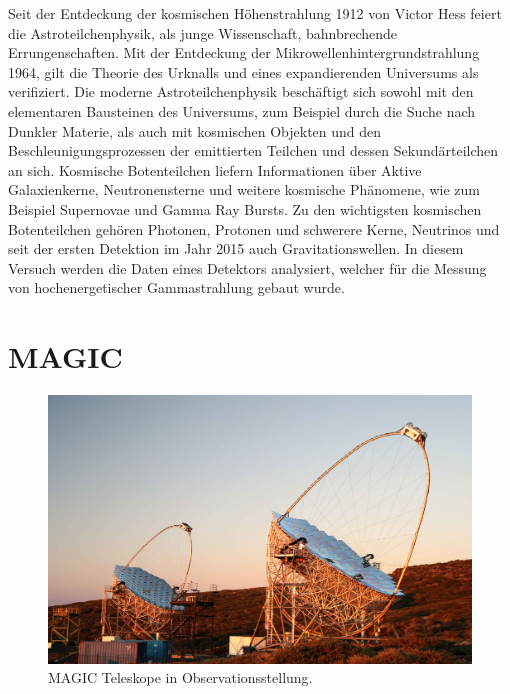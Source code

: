 Seit der Entdeckung der kosmischen Höhenstrahlung 1912
von Victor Hess feiert die Astroteilchenphysik,
als junge Wissenschaft,
bahnbrechende Errungenschaften.
Mit der Entdeckung der Mikrowellenhintergrundstrahlung 1964,
gilt die Theorie des Urknalls
und eines expandierenden Universums als verifiziert.
Die moderne Astroteilchenphysik beschäftigt sich sowohl mit den
elementaren Bausteinen des Universums,
zum Beispiel durch die Suche nach Dunkler Materie,
als auch mit kosmischen Objekten
und den Beschleunigungsprozessen der emittierten Teilchen
und dessen Sekundärteilchen an sich.
Kosmische Botenteilchen liefern Informationen über
Aktive Galaxienkerne,
Neutronensterne
und weitere kosmische Phänomene,
wie zum Beispiel Supernovae und Gamma Ray Bursts.
Zu den wichtigsten kosmischen Botenteilchen gehören Photonen,
Protonen
und schwerere Kerne,
Neutrinos
und seit der ersten Detektion im Jahr 2015 auch Gravitationswellen.
In diesem Versuch werden die Daten eines Detektors analysiert,
welcher für die Messung von hochenergetischer Gammastrahlung gebaut wurde.


\section*{MAGIC}%
\label{sec:magic}

\begin{figure}
		\includegraphics[width=\linewidth]{pictures/magic.JPG}
		\caption{MAGIC Teleskope in Observationsstellung.}%
		\label{fig:magic}
\end{figure}

